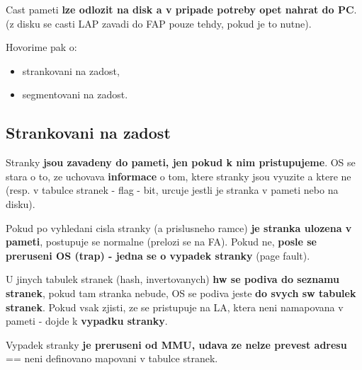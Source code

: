 \documentclass[a4paper, 11pt]{article}
\begin{document}
Cast pameti \textbf{lze odlozit na disk a v pripade potreby opet nahrat do PC}. (z disku se casti LAP zavadi do FAP pouze tehdy, pokud je to nutne).

Hovorime pak o:
\begin{itemize}
    \item strankovani na zadost,
    \item segmentovani na zadost. \\
\end{itemize}

\subsection{Strankovani na zadost}
Stranky \textbf{jsou zavadeny do pameti, jen pokud k nim pristupujeme}. OS se stara o to, ze uchovava \textbf{informace} o tom, ktere stranky jsou vyuzite a ktere ne (resp. v tabulce stranek - flag - bit, urcuje jestli je stranka v pameti nebo na disku).

Pokud po vyhledani cisla stranky (a prislusneho ramce) \textbf{je stranka ulozena v pameti}, postupuje se normalne (prelozi se na FA). Pokud ne, \textbf{posle se preruseni OS (trap) - jedna se o vypadek stranky} (page fault).

U jinych tabulek stranek (hash, invertovanych) \textbf{hw se podiva do seznamu stranek}, pokud tam stranka nebude, OS se podiva jeste \textbf{do svych sw tabulek stranek}. Pokud vsak zjisti, ze se pristupuje na LA, ktera neni namapovana v pameti - dojde k \textbf{vypadku stranky}.

Vypadek stranky \textbf{je preruseni od MMU, udava ze nelze prevest adresu} == neni definovano mapovani v tabulce stranek.
\end{document}
